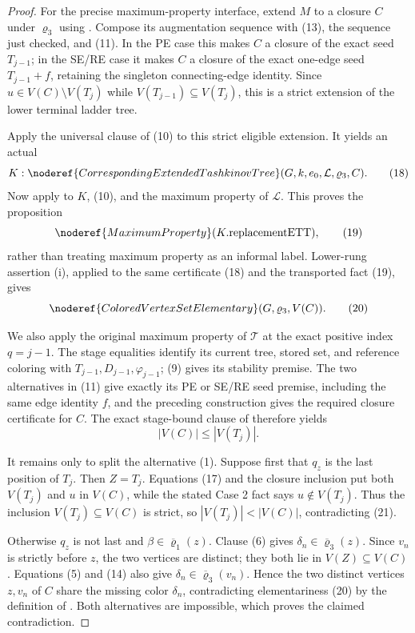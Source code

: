 \begin{proof}
For the precise maximum-property interface, extend \(M\) to a closure
\(C\) under \(\varrho_3\) using .
Compose its augmentation sequence with (13), the sequence just checked,
and (11).  In the PE case this makes \(C\) a closure of the exact seed
\(T_{j-1}\); in the SE/RE case it makes \(C\) a closure of the exact
one-edge seed \(T_{j-1}+f\), retaining the singleton connecting-edge
identity.  Since \(u\in V(C)\setminus V(T_j)\) while
\(V(T_{j-1})\subseteq V(T_j)\), this is a strict extension of the lower
terminal ladder tree.

Apply the universal clause of (10) to this strict eligible extension.
It yields an actual
\[
 K:\noderef{CorrespondingExtendedTashkinovTree}
          (G,k,e_0,\mathcal L,\varrho_3,C).                  \tag{18}
\]
Now apply  to \(K\), (10), and the
maximum property of \(\mathcal L\).  This proves the proposition
\[
                   \noderef{MaximumProperty}(K.\mathrm{replacementETT}),
                                                                    \tag{19}
\]
rather than treating maximum property as an informal label.  Lower-rung
assertion (i), applied to the same certificate (18) and the transported
fact (19), gives
\[
           \noderef{ColoredVertexSetElementary}
                    (G,\varrho_3,V(C)).                     \tag{20}
\]

We also apply the original maximum property of \(\mathcal T\) at the
exact positive index \(q=j-1\).  The stage equalities identify its
current tree, stored set, and reference coloring with
\(T_{j-1},D_{j-1},\varphi_{j-1}\); (9) gives its stability premise.
The two alternatives in (11) give exactly its PE or SE/RE seed premise,
including the same edge identity \(f\), and the preceding construction
gives the required closure certificate for \(C\).  The exact stage-bound
clause of  therefore yields
\[
                         |V(C)|\le |V(T_j)|.                 \tag{21}
\]

It remains only to split the alternative (1).  Suppose first that
\(q_z\) is the last position of \(T_j\).  Then \(Z=T_j\).  Equations
(17) and the closure inclusion put both \(V(T_j)\) and \(u\) in
\(V(C)\), while the stated Case 2 fact says
\(u\notin V(T_j)\).  Thus the inclusion
\(V(T_j)\subseteq V(C)\) is strict, so
\(|V(T_j)|<|V(C)|\), contradicting (21).

Otherwise \(q_z\) is not last and
\(\beta\in\overline{\varrho}_1(z)\).  Clause (6) gives
\(\delta_n\in\overline{\varrho}_3(z)\).  Since \(v_n\) is strictly
before \(z\), the two vertices are distinct; they both lie in
\(V(Z)\subseteq V(C)\).  Equations (5) and (14) also give
\(\delta_n\in\overline{\varrho}_3(v_n)\).  Hence the two distinct
vertices \(z,v_n\) of \(C\) share the missing color \(\delta_n\),
contradicting elementariness (20) by the definition of
.  Both alternatives are impossible,
which proves the claimed contradiction.
\end{proof}
